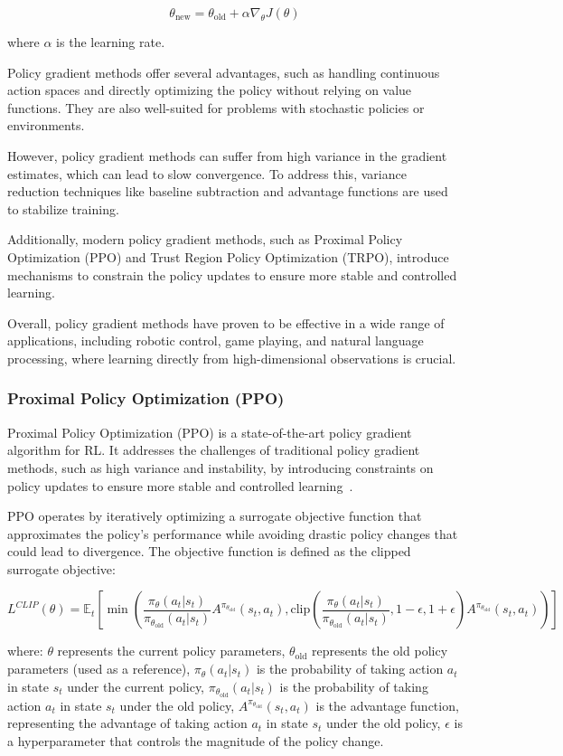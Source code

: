 \[\theta_{\text{new}} = \theta_{\text{old}} + \alpha \nabla_{\theta} J(\theta)\]

where \(\alpha\) is the learning rate.

Policy gradient methods offer several advantages, such as handling continuous action spaces and directly optimizing the policy without relying on value functions. They are also well-suited for problems with stochastic policies or environments.

However, policy gradient methods can suffer from high variance in the gradient estimates, which can lead to slow convergence. To address this, variance reduction techniques like baseline subtraction and advantage functions are used to stabilize training.

Additionally, modern policy gradient methods, such as Proximal Policy Optimization (PPO) and Trust Region Policy Optimization (TRPO), introduce mechanisms to constrain the policy updates to ensure more stable and controlled learning.

Overall, policy gradient methods have proven to be effective in a wide range of applications, including robotic control, game playing, and natural language processing, where learning directly from high-dimensional observations is crucial.

\subsubsection{Proximal Policy Optimization (PPO)}
Proximal Policy Optimization (PPO) is a state-of-the-art policy gradient algorithm for RL. It addresses the challenges of traditional policy gradient methods, such as high variance and instability, by introducing constraints on policy updates to ensure more stable and controlled learning~\cite{schulman2017proximal}.

PPO operates by iteratively optimizing a surrogate objective function that approximates the policy's performance while avoiding drastic policy changes that could lead to divergence. The objective function is defined as the clipped surrogate objective:

\[L^{CLIP}(\theta) = \mathbb{E}_{t} \left[ \min \left( \frac{\pi_{\theta}(a_t|s_t)}{\pi_{\theta_{\text{old}}}(a_t|s_t)} A^{\pi_{\theta_{\text{old}}}}(s_t, a_t), \text{clip}\left( \frac{\pi_{\theta}(a_t|s_t)}{\pi_{\theta_{\text{old}}}(a_t|s_t)}, 1-\epsilon, 1+\epsilon \right) A^{\pi_{\theta_{\text{old}}}}(s_t, a_t) \right) \right]\]

where:
\(\theta\) represents the current policy parameters,
\(\theta_{\text{old}}\) represents the old policy parameters (used as a reference),
\(\pi_{\theta}(a_t|s_t)\) is the probability of taking action \(a_t\) in state \(s_t\) under the current policy,
\(\pi_{\theta_{\text{old}}}(a_t|s_t)\) is the probability of taking action \(a_t\) in state \(s_t\) under the old policy,
\(A^{\pi_{\theta_{\text{old}}}}(s_t, a_t)\) is the advantage function, representing the advantage of taking action \(a_t\) in state \(s_t\) under the old policy,
\(\epsilon\) is a hyperparameter that controls the magnitude of the policy change.

